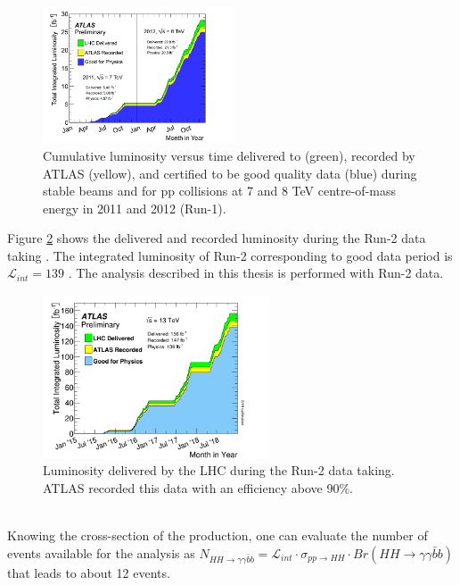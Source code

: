 \begin{figure}[htbp]
    \centering
    \includegraphics[width=0.5\textwidth]{Ch2/Img/LumiRun1.png}
    \caption{Cumulative luminosity versus time delivered to (green), recorded by ATLAS (yellow), and certified to be good quality data (blue) during stable beams and for pp collisions at 7 and 8 TeV centre-of-mass energy in 2011 and 2012 (Run-1).}
    \label{fig:chap2:LHC:Lumi:Run1}
\end{figure}
Figure \ref{fig:chap2:LHC:Lumi} shows the delivered and recorded luminosity during the Run-2 data taking \cite{Lumi2018}. The integrated luminosity of Run-2 corresponding to good data period is $\mathcal{L}_{int} = 139 $ \ifb. The analysis described in this thesis is performed with Run-2 data.\\
\begin{figure}[htbp]
    \centering
    \includegraphics[width=0.6\textwidth]{Ch2/Img/Lumi.png}
    \caption{Luminosity delivered by the LHC during the Run-2 data taking. ATLAS recorded this data with an efficiency above 90\%.}
    \label{fig:chap2:LHC:Lumi}
\end{figure}
\\
Knowing the cross-section of the \HHyybb production, one can evaluate the number of events available for the analysis as $N_{HH\rightarrow\gamma\gamma\bar{b}b} = \mathcal{L}_{int}\cdot\sigma_{pp\rightarrow HH}\cdot Br(HH\rightarrow\gamma\gamma\bar{b}b)$ that leads to about 12 events.

